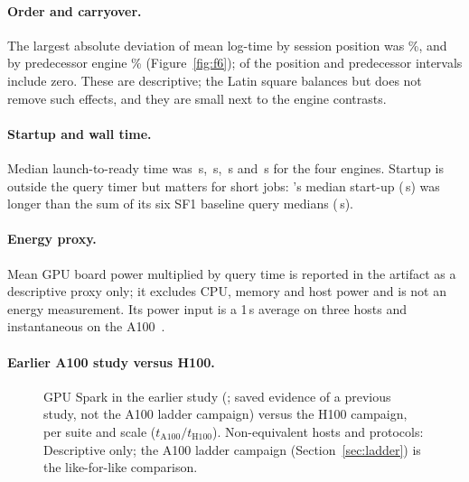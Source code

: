 \documentclass[11pt]{article}
\begin{document}
\paragraph{Order and carryover.} The largest absolute deviation of mean
log-time by session position was \%, and by
predecessor engine \%
(Figure~\ref{fig:f6});  of the
 position and predecessor intervals include zero.
These are descriptive; the Latin square balances but does not remove such
effects, and they are small next to the engine contrasts.

\paragraph{Startup and wall time.} Median launch-to-ready time was
\,s, \,s,
\,s and \,s
for the four engines. Startup is outside the query timer but matters for short
jobs: \sparkgpu{}'s median start-up (\,s) was
longer than the sum of its six SF1 baseline query medians
(\,s).

\paragraph{Energy proxy.} Mean GPU board power multiplied by query time is
reported in the artifact as a descriptive proxy only; it excludes CPU, memory
and host power and is not an energy measurement. Its power input is a 1\,s
average on three hosts and instantaneous on the A100~\citep{nvml_api}.

\paragraph{Earlier A100 study versus H100.}

\begin{figure}[t]
\centering
{}
\caption{GPU Spark in the earlier study (; saved
evidence of a previous study, not the A100 ladder campaign) versus the H100
campaign, per suite and scale ($t_{\mathrm{A100}}/t_{\mathrm{H100}}$).
Non-equivalent hosts and protocols: 
Descriptive only; the A100 ladder campaign (Section~\ref{sec:ladder}) is the
like-for-like comparison. \chartnote}
\label{fig:f9}
\end{figure}
\end{document}
